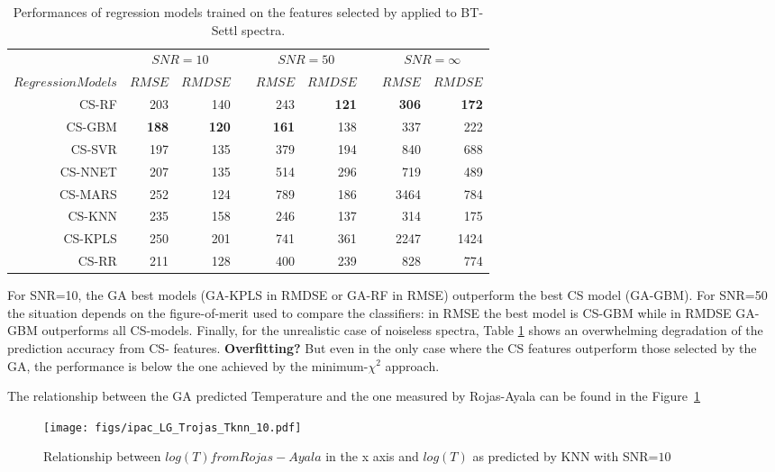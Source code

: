 \begin{table}
\begin{center}
\begin{tabular}{@{}rrrcrrcrr@{}}\toprule
& \multicolumn{2}{c}{$SNR = 10$} & \phantom{ab}& \multicolumn{2}{c}{$SNR = 50$} &
\phantom{ab} & \multicolumn{2}{c}{$SNR = \infty$}\\
\cmidrule{2-3} \cmidrule{5-6} \cmidrule{8-9}
$Regression Models$ & $RMSE$ & $RMDSE$ && $RMSE$ & $RMDSE$     && $RMSE$       & $RMDSE$ \\ \midrule
CS-RF   & 203       & 140       && 243       & {\bf 121} &&  {\bf 306} &  {\bf 172}  \\
CS-GBM  & {\bf 188} & {\bf 120} && {\bf 161} & 138       &&  337       &  222  \\
CS-SVR  & 197       & 135       && 379       & 194       &&  840       &  688  \\
CS-NNET & 207       & 135       && 514       & 296       &&  719       &  489  \\
CS-MARS & 252       & 124       && 789       & 186       && 3464       &  784  \\
CS-KNN  & 235       & 158       && 246       & 137       &&  314       &  175  \\
CS-KPLS & 250       & 201       && 741       & 361       && 2247       & 1424  \\
CS-RR   & 211       & 128       && 400       & 239       &&  828       &  774  \\

\hline
\end{tabular}
\caption {Performances of regression models trained on the features
  selected by \cite{cesetti} applied to BT-Settl spectra.}
\label{tab:tab_CS_Model}
\end{center}
\end{table}

For SNR=10, the GA best models (GA-KPLS in RMDSE or GA-RF in RMSE)
outperform the best CS model (GA-GBM). For SNR=50 the situation
depends on the figure-of-merit used to compare the classifiers: in
RMSE the best model is CS-GBM while in RMDSE GA-GBM outperforms all
CS-models. Finally, for the unrealistic case of noiseless spectra,
Table \ref{tab:tab_CS_Model} shows an overwhelming degradation of the
prediction accuracy from CS- features. {\bf Overfitting?} But even in
the only case where the CS features outperform those selected by the
GA, the performance is below the one achieved by the minimum-$\chi^2$
approach.

The relationship between the GA predicted Temperature and the one
measured by Rojas-Ayala can be found in the
Figure~\ref{fig:ipac_lt_lt}
\begin{figure}
 \begin{center}
 \texttt{[image: figs/ipac\_LG\_Trojas\_Tknn\_10.pdf]}
 \caption{Relationship between $log(T) from Rojas-Ayala $ in the x axis 
 and $log(T)$ as predicted by KNN with SNR=$10$}
 \label{fig:ipac_lt_lt}
 \end{center}
\end{figure}

